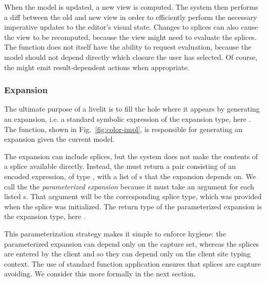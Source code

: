 When the model is updated, a new view is 
computed. The system then performs a diff between the old and new view in order to 
efficiently perform the necessary imperative updates to the editor's visual state.
Changes to splices can also cause the view to be recomputed, because the view might 
need to evaluate the splices. The  function does not itself 
have the ability to request evaluation, because the model should not depend directly  
which closure the user has selected. Of course, the  might emit 
result-dependent actions when appropriate.

\subsubsection{Expansion}
\label{sec:expansion}
The ultimate purpose of a livelit is to fill the hole where it appears by generating an expansion,
i.e. a standard symbolic expression of the expansion type, here .
The  function, shown in Fig.~\ref{fig:color-impl}, is responsible for generating 
an expansion given the current model.

The expansion can include splices, but the system does not make the contents of a splice 
available directly. Instead, the  must return a pair consisting of an encoded expression, of type 
, with a list of s that the expansion depends on. 
We call the  the \emph{parameterized expansion}
 because it must take an argument for each listed s. 
 That argument will be the corresponding splice 
type, which was provided when the splice was initialized. 
 The return type of the parameterized expansion is the expansion type, here .

This parameterization strategy makes it simple to enforce hygiene: the parameterized expansion 
can depend only on the capture set, whereas the splices are entered by the client and so they can 
depend only on the client site typing context. The use of standard function application ensures
that splices are capture avoiding. We consider this more formally in the next section.
